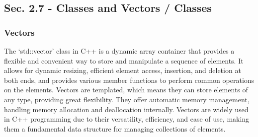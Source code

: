 \subsection*{Sec. 2.7 - Classes and Vectors / Classes}
\subsubsection*{Vectors}

The `std::vector' class in C++ is a dynamic array container that provides a flexible and convenient way to store and manipulate a sequence of elements. It allows for dynamic resizing, efficient element access, insertion, and deletion 
at both ends, and provides various member functions to perform common operations on the elements. Vectors are templated, which means they can store elements of any type, providing great flexibility. They offer automatic memory management, 
handling memory allocation and deallocation internally. Vectors are widely used in C++ programming due to their versatility, efficiency, and ease of use, making them a fundamental data structure for managing collections of elements.

